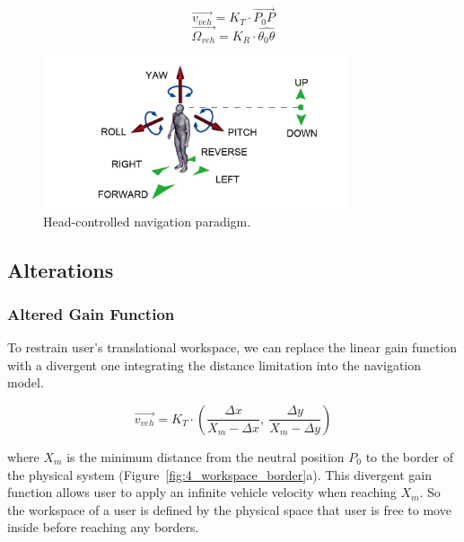 \begin{equation}
\overrightarrow{v_{veh}}=K_{T}\cdot \overrightarrow{P_{0}P}
\end{equation}
\begin{equation}
\overrightarrow{\Omega_{veh}}=K_{R}\cdot \widehat{\theta_{0}\theta}
\end{equation}

\begin{figure}[tb]
  \centering
  \includegraphics[width=0.8\textwidth]{figures/ch4/HCNav}
  \caption{\label{fig:4_hcnav}Head-controlled navigation paradigm.}
\end{figure}

\subsection{Alterations}

\subsubsection{Altered Gain Function}
 To restrain user's translational workspace, we can replace the linear gain function with a divergent one integrating the distance limitation into the navigation model.

\begin{equation}
\overrightarrow{v_{veh}}=K_{T}\cdot \left(\frac{\Delta x}{X_{m}-\Delta x},\:\frac{\Delta y}{X_{m}-\Delta y}\right)
\end{equation}

where $X_{m}$ is the minimum distance from the neutral position $P_{0}$ to the border of the physical system (Figure~\ref{fig:4_workspace_border}a). This divergent gain function allows user to apply an infinite vehicle velocity when reaching $X_{m}$. So the workspace of a user is defined by the physical space that user is free to move inside before reaching any borders.

